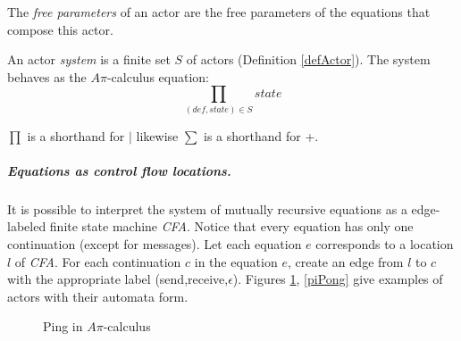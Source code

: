 \documentclass[a4paper]{report}
\numberwithin{algorithm}{chapter}
\begin{document}
\begin{define}
\label{defFreeParam}
The \emph{free parameters} of an actor are the free parameters of the equations that compose this actor.
\end{define}

\begin{define}[System]
\label{defSys}
An actor \emph{system} is a finite set $S$ of actors (Definition \ref{defActor}).
The system behaves as the $A\pi$-calculus equation:
\begin{equation*}
\prod_{(\mathit{def},\mathit{state}) \in S} \mathit{state}
\end{equation*}
\end{define}

\begin{rem}
$\prod$ is a shorthand for $|$ likewise $\sum$ is a shorthand for +.
\end{rem}

\subparagraph{Equations as control flow locations.}
It is possible to interpret the system of mutually recursive equations as a edge-labeled finite state machine \emph{CFA}.
Notice that every equation has only one continuation (except for messages).
Let each equation $e$ corresponds to a location $l$ of \emph{CFA}.
For each continuation $c$ in the equation $e$, create an edge from $l$ to $c$ with the appropriate label (send,receive,$\epsilon$).
Figures \ref{piPing}, \ref{piPong} give examples of actors with their automata form.


\begin{figure}[ht]
  \centering
{}
  \caption{Ping in $A\pi$-calculus}
  \label{piPing}
\end{figure}
\end{document}
